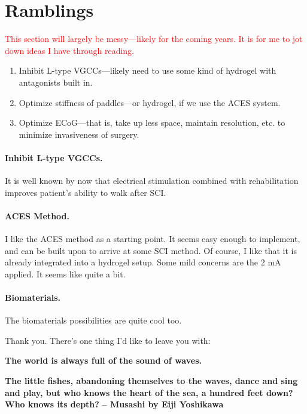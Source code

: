 \documentclass[12pt]{report}
\begin{document}
\chapter{Ramblings}

{\large \textcolor{red}{This section will largely be messy---likely for the coming years. It is for me to jot down ideas I have through reading.}}\newline

\begin{enumerate}
    \item Inhibit L-type VGCCs---likely need to use some kind of hydrogel with antagonists built in. 
    \item Optimize stiffness of paddles---or hydrogel, if we use the ACES system. 
    \item Optimize ECoG---that is, take up less space, maintain resolution, etc. to minimize invasiveness of surgery. 
\end{enumerate}

\subsubsection{Inhibit L-type VGCCs.}
It is well known by now that electrical stimulation combined with rehabilitation improves patient's ability to walk after SCI. 

\subsubsection{ACES Method.}

I like the ACES method as a starting point. It seems easy enough to implement, and can be built upon to arrive at some SCI method. Of course, I like that it is already integrated into a hydrogel setup. Some mild concerns are the 2 mA applied. It seems like quite a bit. 

\subsubsection{Biomaterials.}

The biomaterials possibilities are quite cool too. 

\vfill\pagebreak

\begin{center}
Thank you. There's one thing I'd like to leave you with: 
\end{center}

\vspace{2in}
            \begin{center}
            \begin{minipage}[l]{10cm}\small
            \textbf{The world is always full of the sound of waves.}\newline

            \textbf{The little fishes, abandoning themselves to the waves, dance and sing and play, but who knows the heart of the sea, a hundred feet down? Who knows its depth?}\newline
            \textbf{-- Musashi by Eiji Yoshikawa}
            \end{minipage}
            \end{center}
\vfill
\end{document}
